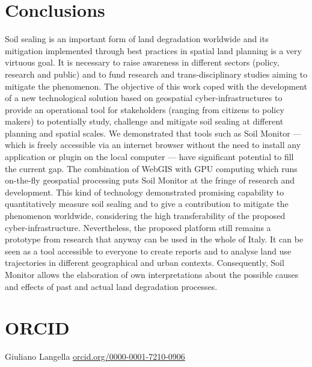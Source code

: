 \documentclass[APA,LATO1COL,doublespace]{WileyNJD-v2}
\newcommand\orcidicon[1]{\href{https://orcid.org/#1}{\mbox{\scalerel*{
\begin{tikzpicture}[yscale=-1,transform shape]
\pic{orcidlogo};
\end{tikzpicture}
}{|}}}}
\begin{document}
\section{Conclusions}
Soil sealing is an important form of land degradation worldwide and its mitigation implemented through best practices in spatial land planning is a very virtuous goal.
It is necessary to raise awareness in different sectors (policy, research and public) and to fund research and trans-disciplinary studies aiming to mitigate the phenomenon.
The objective of this work coped with the development of a new technological solution based on geospatial cyber-infrastructures to provide an operational tool for stakeholders (ranging from citizens to policy makers) to potentially study, challenge and mitigate soil sealing at different planning and spatial scales.
We demonstrated that tools such as Soil Monitor --- which is freely accessible via an internet browser without the need to install any application or plugin on the local computer --- have significant potential to fill the current gap.
The combination of WebGIS with GPU computing which runs on-the-fly geospatial processing puts Soil Monitor at the fringe of research and development. 
This kind of technology demonstrated promising capability to quantitatively measure soil sealing and to give a contribution to mitigate the %
phenomenon worldwide, considering the high transferability of the proposed cyber-infrastructure.
Nevertheless, the proposed platform still remains a prototype from research that anyway can be used in the whole of Italy.
It can be seen as a tool accessible to everyone to create reports and 
to analyse land use trajectories in different geographical and urban contexts.
Consequently, Soil Monitor allows the elaboration of own interpretations about the possible causes and effects of past and actual land degradation processes.

\section*{ORCID}
Giuliano Langella \href{https://orcid.org/0000-0001-7210-0906}{ {\orcidicon{0000-0001-7210-0906}}\hspace{1.0mm} orcid.org/0000-0001-7210-0906}


\end{document}
